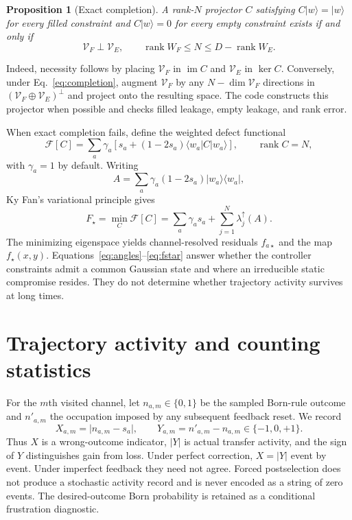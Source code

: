 \documentclass[aps,prb,onecolumn,nofootinbib,superscriptaddress]{revtex4-2}
\newcommand{\rank}{\operatorname{rank}}
\newcommand{\cV}{\mathcal{V}}
\newcommand{\cF}{\mathcal{F}}
\newcommand{\ket}[1]{\lvert #1\rangle}
\newcommand{\bra}[1]{\langle #1\rvert}
\newtheorem{proposition}{Proposition}
\begin{document}
\begin{proposition}[Exact completion]
A rank-$N$ projector $C$ satisfying
$C\ket{w}=\ket{w}$ for every filled constraint and
$C\ket{w}=0$ for every empty constraint exists if and only if
\begin{equation}
 \cV_F\perp\cV_E,\qquad
 \rank W_F\leq N\leq D-\rank W_E.
 \label{eq:completion}
\end{equation}
\end{proposition}

Indeed, necessity follows by placing $\cV_F$ in $\operatorname{im}C$ and
$\cV_E$ in $\ker C$.  Conversely, under Eq.~\eqref{eq:completion}, augment
$\cV_F$ by any $N-\dim\cV_F$ directions in
$(\cV_F\oplus\cV_E)^\perp$ and project onto the resulting space.  The code
constructs this projector when possible and checks filled leakage, empty
leakage, and rank error.

When exact completion fails, define the weighted defect functional
\begin{equation}
 \cF[C]=\sum_a\gamma_a
 \left[s_a+(1-2s_a)\bra{w_a}C\ket{w_a}\right],
 \qquad \rank C=N,
 \label{eq:cost}
\end{equation}
with $\gamma_a=1$ by default.  Writing
\begin{equation}
 A=\sum_a\gamma_a(1-2s_a)\ket{w_a}\bra{w_a},
\end{equation}
Ky Fan's variational principle gives
\begin{equation}
 F_\star=\min_C\cF[C]
 =\sum_a\gamma_as_a+\sum_{j=1}^{N}\lambda_j^\uparrow(A).
 \label{eq:fstar}
\end{equation}
The minimizing eigenspace yields channel-resolved residuals
$f_{a\star}$ and the map $f_\star(x,y)$.  Equations~\eqref{eq:angles}--\eqref{eq:fstar}
answer whether the controller constraints admit a common Gaussian state and
where an irreducible static compromise resides.  They do not determine whether
trajectory activity survives at long times.

\section{Trajectory activity and counting statistics}

For the $m$th visited channel, let $n_{a,m}\in\{0,1\}$ be the sampled
Born-rule outcome and $n'_{a,m}$ the occupation imposed by any subsequent
feedback reset.  We record
\begin{equation}
 X_{a,m}=\lvert n_{a,m}-s_a\rvert,
 \qquad
 Y_{a,m}=n'_{a,m}-n_{a,m}\in\{-1,0,+1\}.
 \label{eq:xy}
\end{equation}
Thus $X$ is a wrong-outcome indicator, $\lvert Y\rvert$ is actual transfer
activity, and the sign of $Y$ distinguishes gain from loss.  Under perfect
correction, $X=\lvert Y\rvert$ event by event.  Under imperfect feedback they
need not agree.  Forced postselection does not produce a stochastic activity
record and is never encoded as a string of zero events.  The desired-outcome
Born probability is retained as a conditional frustration diagnostic.
\end{document}

